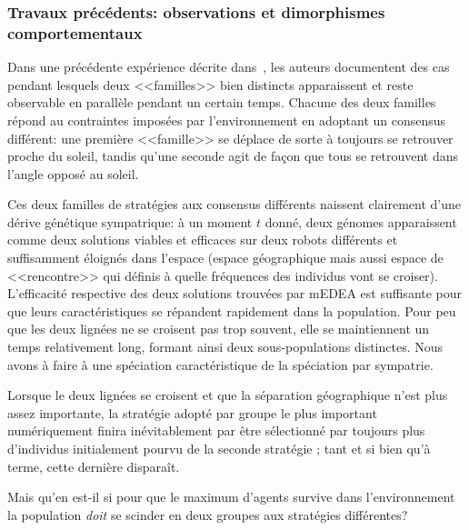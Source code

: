 \documentclass[a4paper,10pt]{report}
\begin{document}

\subsubsection{Travaux précédents: observations et dimorphismes comportementaux}
\label{sec:twosuns}


Dans une précédente expérience décrite dans~\cite{bredeche11mcmds}, les auteurs documentent des cas pendant lesquels deux <<familles>> bien distincts apparaissent et reste observable en parallèle pendant un certain temps. Chacune des deux familles répond au contraintes imposées par l'environnement en adoptant un consensus différent: une première <<famille>> se déplace de sorte à toujours se retrouver proche du soleil, tandis qu'une seconde agit de fa\c con que tous se retrouvent dans l'angle opposé au soleil. 

Ces deux familles de stratégies aux consensus différents naissent clairement d'une dérive génétique sympatrique: à un moment $t$ donné, deux génomes apparaissent comme deux solutions viables et efficaces sur deux robots différents et suffisamment éloignés dans l'espace (espace géographique mais aussi espace de <<rencontre>> qui définis à quelle fréquences des individus vont se croiser). L'efficacité respective des deux solutions trouvées par mEDEA est suffisante pour que leurs caractéristiques se répandent rapidement dans la population. Pour peu que les deux lignées ne se croisent pas trop souvent, elle se maintiennent un temps relativement long, formant ainsi deux sous-populations distinctes. Nous avons à faire à une spéciation caractéristique de la spéciation par sympatrie.

Lorsque le deux lignées se croisent et que la séparation géographique n'est plus assez importante, la stratégie adopté par groupe le plus important numériquement finira inévitablement par être sélectionné par toujours plus d'individus initialement pourvu de la seconde stratégie ; tant et si bien qu'à terme, cette dernière disparaît.

Mais qu'en est-il si pour que le maximum d'agents survive dans l'environnement la population \emph{doit} se scinder en deux groupes aux stratégies différentes? 
\end{document}
